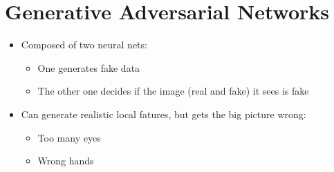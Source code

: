 \section{Generative Adversarial Networks}

  \begin{itemize}
    \item Composed of two neural nets:
    \begin{itemize}
      \item One generates fake data
      \item The other one decides if the image (real and fake) it sees is fake
    \end{itemize}

    \item Can generate realistic local fatures, but gets the big picture
    wrong:
    \begin{itemize}
      \item Too many eyes
      \item Wrong hands
    \end{itemize}
  \end{itemize}
